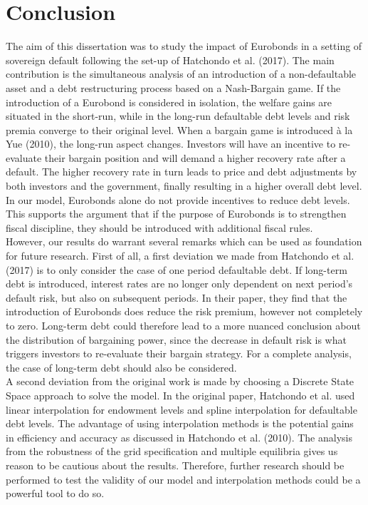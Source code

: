 \pagestyle{headings}
\chapter*{Conclusion}
The aim of this dissertation was to study the impact of Eurobonds in a setting of sovereign default following the set-up of Hatchondo et al. (2017). The main contribution is the simultaneous analysis of an introduction of a non-defaultable asset and a debt restructuring process based on a Nash-Bargain game. If the introduction of a Eurobond is considered in isolation, the welfare gains are situated in the short-run, while in the long-run defaultable debt levels and risk premia converge to their original level. When a bargain game is introduced à la Yue (2010), the long-run aspect changes. Investors will have an incentive to re-evaluate their bargain position and will demand a higher recovery rate after a default. The higher recovery rate in turn leads to price and debt adjustments by both investors and the government, finally resulting in a higher overall debt level. In our model, Eurobonds alone do not provide incentives to reduce debt levels. This supports the argument that if the purpose of Eurobonds is to strengthen fiscal discipline, they should be introduced with additional fiscal rules.\\

However, our results do warrant several remarks which can be used as foundation for future research. First of all, a first deviation we made from Hatchondo et al. (2017) is to only consider the case of one period defaultable debt. If long-term debt is introduced, interest rates are no longer only dependent on next period's default risk, but also on subsequent periods. In their paper, they find that the introduction of Eurobonds does reduce the risk premium, however not completely to zero. Long-term debt could therefore lead to a more nuanced conclusion about the distribution of bargaining power, since the decrease in default risk is what triggers investors to re-evaluate their bargain strategy. For a complete analysis, the case of long-term debt should also be considered.\\

A second deviation from the original work is made by choosing a Discrete State Space approach to solve the model. In the original paper, Hatchondo et al. used linear interpolation for endowment levels and spline interpolation for defaultable debt levels. The advantage of using interpolation methods is the potential gains in efficiency and accuracy as discussed in Hatchondo et al. (2010). The analysis from the robustness of the grid specification and multiple equilibria gives us reason to be cautious about the results. Therefore, further research should be performed to test the validity of our model and interpolation methods could be a powerful tool to do so.\\

